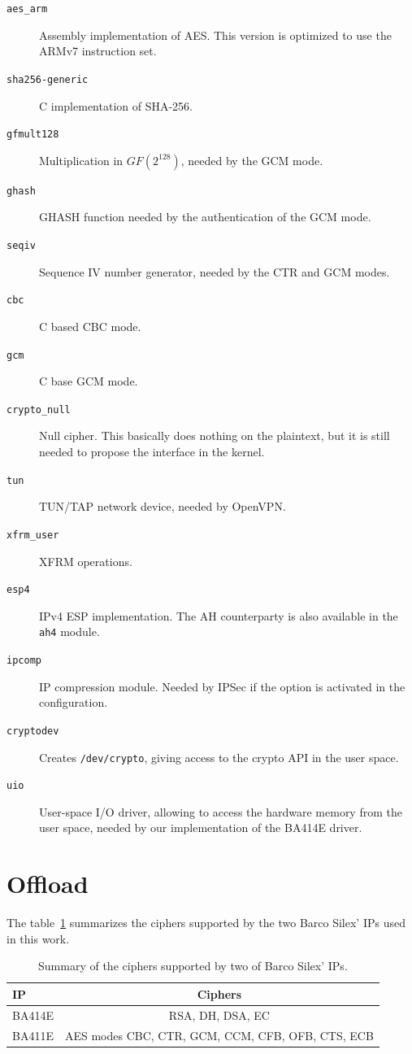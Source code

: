 \begin{description}
	\item[\texttt{aes\_arm}] Assembly implementation of AES. This version is optimized to use the ARMv7 instruction set.
	\item[\texttt{sha256-generic}] C implementation of SHA-256.
	\item[\texttt{gfmult128}] Multiplication in $GF(2^128)$, needed by the GCM mode.
	\item[\texttt{ghash}] GHASH function needed by the authentication of the GCM mode.
	\item[\texttt{seqiv}] Sequence IV number generator, needed by the CTR and GCM modes.
	\item[\texttt{cbc}] C based CBC mode.
	\item[\texttt{gcm}] C base GCM mode.
	\item[\texttt{crypto\_null}] Null cipher. This basically does nothing on the plaintext, but it is still needed to propose the interface in the kernel.
	\item[\texttt{tun}] TUN/TAP network device, needed by OpenVPN.
	\item[\texttt{xfrm\_user}] XFRM operations.
	\item[\texttt{esp4}] IPv4 ESP implementation. The AH counterparty is also available in the \texttt{ah4} module.
	\item[\texttt{ipcomp}] IP compression module. Needed by IPSec if the option is activated in the configuration.
	\item[\texttt{cryptodev}] Creates \texttt{/dev/crypto}, giving access to the crypto API in the user space.
	\item[\texttt{uio}] User-space I/O driver, allowing to access the hardware memory from the user space, needed by our implementation of the BA414E driver.
\end{description}

\section{Offload}

The table~\ref{tab:ip-ciphers} summarizes the ciphers supported by the two Barco Silex' IPs used in this work.

\begin{table}[ht]
\begin{tabular}{|l|c|}\hline
IP & Ciphers \\ \hline
BA414E & RSA, DH, DSA, EC \\ 
BA411E & AES modes CBC, CTR, GCM, CCM, CFB, OFB, CTS, ECB \\ \hline
\end{tabular}
\caption{Summary of the ciphers supported by two of Barco Silex' IPs.}{}
\label{tab:ip-ciphers}
\end{table}

